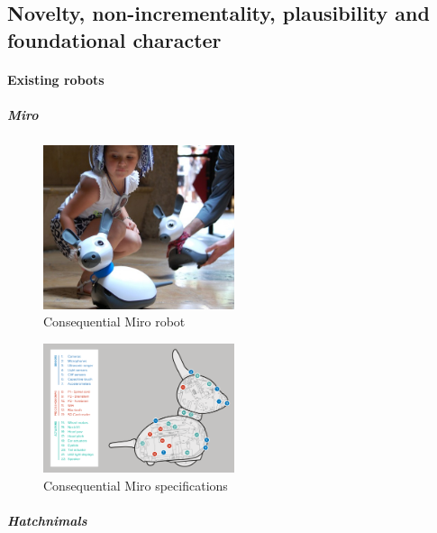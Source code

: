 \documentclass[]{article}
\let\oldparagraph\paragraph
\renewcommand{\paragraph}[1]{\oldparagraph{#1}\mbox{}}
\let\oldsubparagraph\subparagraph
\renewcommand{\subparagraph}[1]{\oldsubparagraph{#1}\mbox{}}
\begin{document}
\hypertarget{novelty-non-incrementality-plausibility-and-foundational-character}{%
\subsection{Novelty, non-incrementality, plausibility and foundational
character}\label{novelty-non-incrementality-plausibility-and-foundational-character}}

\hypertarget{existing-robots}{%
\paragraph{Existing robots}\label{existing-robots}}

\hypertarget{miro}{%
\subparagraph{Miro}\label{miro}}

\begin{figure}
\centering
\includegraphics[width=0.5\textwidth,height=\textheight]{figs/miro.jpg}
\caption{Consequential Miro robot}
\end{figure}

\begin{figure}
\centering
\includegraphics[width=0.5\textwidth,height=\textheight]{figs/miro-spec.png}
\caption{Consequential Miro specifications}
\end{figure}

\hypertarget{hatchnimals}{%
\subparagraph{Hatchnimals}\label{hatchnimals}}
\end{document}
